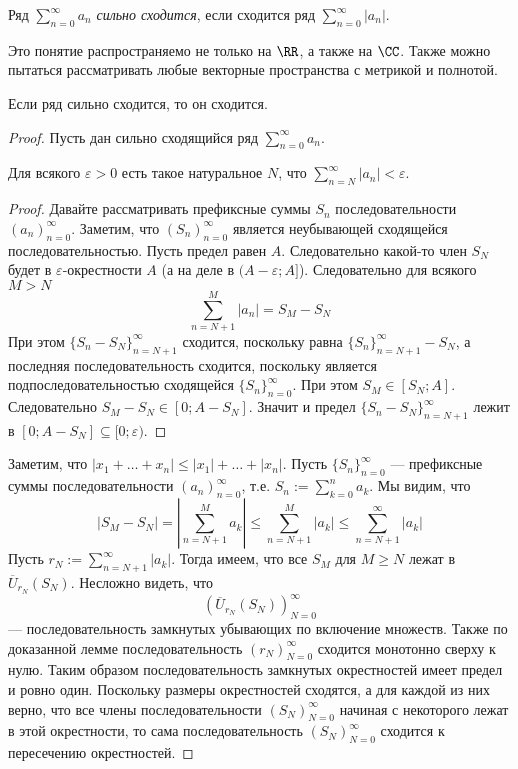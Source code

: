 \documentclass[12pt,a4paper]{article}
\begin{document}
    \begin{definition}
        Ряд $\sum_{n=0}^\infty a_n$ \emph{сильно сходится}, если сходится ряд $\sum_{n=0}^\infty |a_n|$.
    \end{definition}

    \begin{remark*}
        Это понятие распространяемо не только на $\RR$, а также на $\CC$. Также можно пытаться рассматривать любые векторные пространства с метрикой и полнотой.
    \end{remark*}

    \begin{lemma}
        Если ряд сильно сходится, то он сходится.
    \end{lemma}

    \begin{proof}
        Пусть дан сильно сходящийся ряд $\sum_{n=0}^\infty a_n$.

        \begin{thlemma}
            Для всякого $\varepsilon > 0$ есть такое натуральное $N$, что $\sum_{n=N}^\infty |a_n| < \varepsilon$.
        \end{thlemma}

        \begin{proof}
            Давайте рассматривать префиксные суммы $S_n$ последовательности $(a_n)_{n=0}^\infty$. Заметим, что $(S_n)_{n=0}^\infty$ является неубывающей сходящейся последовательностью. Пусть предел равен $A$. Следовательно какой-то член $S_N$ будет в $\varepsilon$-окрестности $A$ (а на деле в $(A - \varepsilon; A]$). Следовательно для всякого $M > N$
            \[\sum_{n=N+1}^M |a_n| = S_M - S_N\]
            При этом $\{S_n - S_N\}_{n=N+1}^\infty$ сходится, поскольку равна $\{S_n\}_{n=N+1}^\infty - S_N$, а последняя последовательность сходится, поскольку является подпоследовательностью сходящейся $\{S_n\}_{n=0}^\infty$. При этом $S_M \in [S_N; A]$. Следовательно $S_M - S_N \in [0; A - S_N]$. Значит и предел $\{S_n - S_N\}_{n=N+1}^\infty$ лежит в $[0; A - S_N] \subseteq [0; \varepsilon)$.
        \end{proof}

        Заметим, что $|x_1 + \dots + x_n| \leqslant |x_1| + \dots + |x_n|$. Пусть $\{S_n\}_{n=0}^\infty$ --- префиксные суммы последовательности $(a_n)_{n=0}^\infty$, т.е. $S_n := \sum_{k=0}^n a_k$. Мы видим, что
        \[|S_M - S_N| = \left|\sum_{n=N+1}^M a_k\right| \leqslant \sum_{n=N+1}^M |a_k| \leqslant \sum_{n=N+1}^\infty |a_k|\]
        Пусть $r_N := \sum_{n=N+1}^\infty |a_k|$. Тогда имеем, что все $S_M$ для $M \geqslant N$ лежат в $\overline{U}_{r_N}(S_N)$. Несложно видеть, что
        \[\left(\overline{U}_{r_N}(S_N)\right)_{N=0}^\infty\]
        --- последовательность замкнутых убывающих по включение множеств. Также по доказанной лемме последовательность $(r_N)_{N=0}^\infty$ сходится монотонно сверху к нулю. Таким образом последовательность замкнутых окрестностей имеет предел и ровно один. Поскольку размеры окрестностей сходятся, а для каждой из них верно, что все члены последовательности $(S_N)_{N=0}^\infty$ начиная с некоторого лежат в этой окрестности, то сама последовательность $(S_N)_{N=0}^\infty$ сходится к пересечению окрестностей.
    \end{proof}
\end{document}
